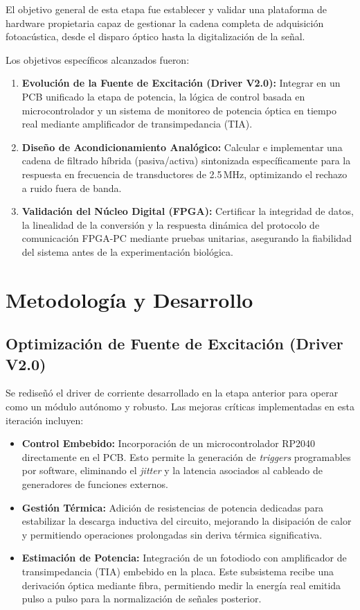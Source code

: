 \documentclass[12pt,letterpaper]{article}
\begin{document}
El objetivo general de esta etapa fue establecer y validar una plataforma de hardware propietaria capaz de gestionar la cadena completa de adquisición fotoacústica, desde el disparo óptico hasta la digitalización de la señal.

Los objetivos específicos alcanzados fueron:

\begin{enumerate}
    \item \textbf{Evolución de la Fuente de Excitación (Driver V2.0):} Integrar en un PCB unificado la etapa de potencia, la lógica de control basada en microcontrolador y un sistema de monitoreo de potencia óptica en tiempo real mediante amplificador de transimpedancia (TIA).
    \item \textbf{Diseño de Acondicionamiento Analógico:} Calcular e implementar una cadena de filtrado híbrida (pasiva/activa) sintonizada específicamente para la respuesta en frecuencia de transductores de 2.5\,MHz, optimizando el rechazo a ruido fuera de banda.
    \item \textbf{Validación del Núcleo Digital (FPGA):} Certificar la integridad de datos, la linealidad de la conversión y la respuesta dinámica del protocolo de comunicación FPGA-PC mediante pruebas unitarias, asegurando la fiabilidad del sistema antes de la experimentación biológica.
\end{enumerate}
\section{Metodología y Desarrollo}

\subsection{Optimización de Fuente de Excitación (Driver V2.0)}
Se rediseñó el driver de corriente desarrollado en la etapa anterior para operar como un módulo autónomo y robusto. Las mejoras críticas implementadas en esta iteración incluyen:

\begin{itemize}
    \item \textbf{Control Embebido:} Incorporación de un microcontrolador RP2040 directamente en el PCB. Esto permite la generación de \textit{triggers} programables por software, eliminando el \textit{jitter} y la latencia asociados al cableado de generadores de funciones externos.
    \item \textbf{Gestión Térmica:} Adición de resistencias de potencia dedicadas para estabilizar la descarga inductiva del circuito, mejorando la disipación de calor y permitiendo operaciones prolongadas sin deriva térmica significativa.
    \item \textbf{Estimación de Potencia:} Integración de un fotodiodo con amplificador de transimpedancia (TIA) embebido en la placa. Este subsistema recibe una derivación óptica mediante fibra, permitiendo medir la energía real emitida pulso a pulso para la normalización de señales posterior.
\end{itemize}
\end{document}
